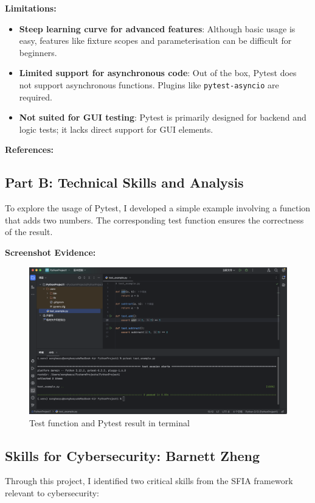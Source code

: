\documentclass[a4paper, 11pt]{report}
\begin{document}
\textbf{Limitations:}
\begin{itemize}
  \item \textbf{Steep learning curve for advanced features}: Although basic usage is easy, features like fixture scopes and parameterisation can be difficult for beginners.
  \item \textbf{Limited support for asynchronous code}: Out of the box, Pytest does not support asynchronous functions. Plugins like \texttt{pytest-asyncio} are required.
  \item \textbf{Not suited for GUI testing}: Pytest is primarily designed for backend and logic tests; it lacks direct support for GUI elements.
\end{itemize}

\textbf{References:} \\
\cite{okken2017pytest} \cite{pytestdoc}

\subsection*{Part B: Technical Skills and Analysis}

To explore the usage of Pytest, I developed a simple example involving a function that adds two numbers. The corresponding test function ensures the correctness of the result.

\textbf{Screenshot Evidence:}
\begin{figure}[H]
    \centering
    \includegraphics[width=0.8\linewidth]{Jared/pytest_code.png}
    \caption{Test function and Pytest result in terminal}
\end{figure}


\newpage

\subsection{Skills for Cybersecurity: Barnett Zheng}
Through this project, I identified two critical skills from the SFIA framework relevant to cybersecurity:
\end{document}

